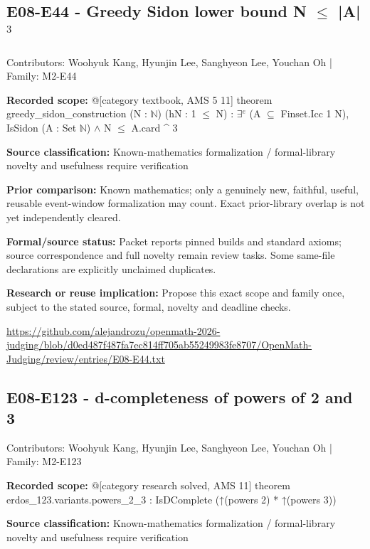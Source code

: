 \documentclass[11pt,a4paper]{article}
\begin{document}
\begin{samepage}
\subsection{E08-E44  -  Greedy Sidon lower bound N \ensuremath{\leq} |A|\ensuremath{^3}}
{\small Contributors: Woohyuk Kang, Hyunjin Lee, Sanghyeon Lee, Youchan Oh | Family: M2-E44\par}

\textbf{Recorded scope:} @[category textbook, AMS 5 11] theorem greedy\_sidon\_construction (N : \ensuremath{\mathbb{N}}) (hN : 1 \ensuremath{\leq} N) : \ensuremath{\exists}\ensuremath{^{e}} (A \ensuremath{\subseteq} Finset.Icc 1 N), IsSidon (A : Set \ensuremath{\mathbb{N}}) \ensuremath{\wedge} N \ensuremath{\leq} A.card \textasciicircum{} 3


\end{samepage}
\textbf{Source classification:} Known-mathematics formalization / formal-library novelty and usefulness require verification

\textbf{Prior comparison:} Known mathematics; only a genuinely new, faithful, useful, reusable event-window formalization may count. Exact prior-library overlap is not yet independently cleared.

\textbf{Formal/source status:} Packet reports pinned builds and standard axioms; source correspondence and full novelty remain review tasks. Some same-file declarations are explicitly unclaimed duplicates.

\textbf{Research or reuse implication:} Propose this exact scope and family once, subject to the stated source, formal, novelty and deadline checks.

{\small \url{https://github.com/alejandrozu/openmath-2026-judging/blob/d0ed487f487fa7ec814ff705ab55249983fe8707/OpenMath-Judging/review/entries/E08-E44.txt}\par}

\begin{samepage}
\subsection{E08-E123  -  d-completeness of powers of 2 and 3}
{\small Contributors: Woohyuk Kang, Hyunjin Lee, Sanghyeon Lee, Youchan Oh | Family: M2-E123\par}

\textbf{Recorded scope:} @[category research solved, AMS 11] theorem erdos\_123.variants.powers\_2\_3 : IsDComplete (↑(powers 2) * ↑(powers 3))


\end{samepage}
\textbf{Source classification:} Known-mathematics formalization / formal-library novelty and usefulness require verification
\end{document}
